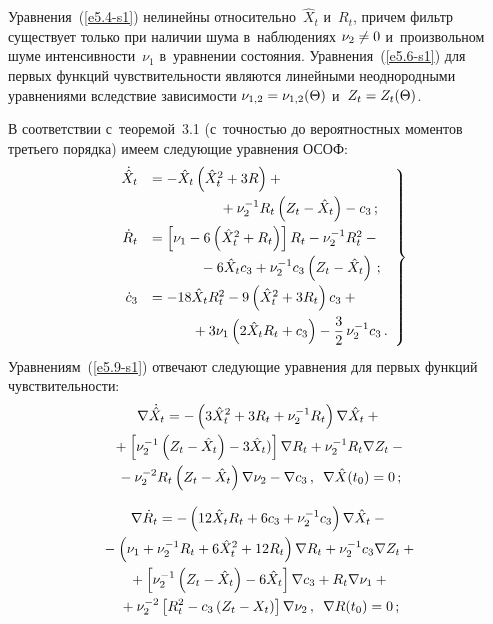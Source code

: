 \begin{multicols}{2}
Уравнения~(\ref{e5.4-s1}) нелинейны относительно~$\hat X_t$ и~$R_t$, 
причем фильтр существует только при наличии шума в~наблюдениях  $\nu_2 \hm\ne 0$ 
и~произвольном шуме интенсивности~$\nu_1$ в~уравнении состояния. 
Уравнения~(\ref{e5.6-s1}) 
для первых функций чувствительности являются линейными неоднородными уравнениями 
вследствие зависимости $\nu_{1,2} \hm= \nu_{1,2} (\Theta)$ и~$Z_t\hm = Z_t (\Theta)$.

 В соответствии с~теоремой~3.1 (с~точ\-ностью до вероятностных моментов третьего порядка) 
 имеем следующие уравнения ОСОФ:
 \begin{equation}
 \left.
 \begin{array}{rl}
 \dot{\hat X}_t &=-\hat X_t \left(\hat X_t^2 + 3 R\right) + {}\\[6pt]
 &\hspace*{17mm}{}+\nu_2^{-1} R_t 
 \left(Z_t - \hat X_t\right) - c_3\,; %
 \\[6pt]
\dot R_t &= \lk\nu_1 - 6 \left(\hat X_t^2 + R_t\right)\rk R_t - 
  \nu_2^{-1} R_t^2 - {}\\[6pt]
  &\hspace*{12mm}{}-
 6 \hat X_t c_3 + \nu_2^{-1} c_3 \left(Z_t - \hat X_t\right)\,; %
 \\[6pt]
  \dot c_3 &= -18 \hat X_t R_t^2 - 9 \left(\hat X_t^2 + 3 R_t\right) 
  c_3+ {}\\[6pt]
& \hspace*{10mm} {}+
 3 \nu_1 \left( 2 \hat X_t R_t + c_3\right) - \fr{3}{2}\, \nu_2^{-1} c_3\,.
 \end{array}
 \right\}
 \label{e5.9-s1}
 \end{equation}
Уравнениям~(\ref{e5.9-s1}) отвечают следующие уравнения 
для первых функций чувствительности:
\begin{multline*}
\nabla \dot{\hat X}_t=- \left(3 \hat X_t^2 + 3 R_t + \nu_2^{-1} R_t\right) 
\nabla \hat X_t +{}\\
{}+\lk \nu_2^{-1} \left(Z_t -\hat X_t\right) - 3 \hat X_t)\rk \nabla R_t +
 \nu_2^{-1} R_t\nabla Z_t - {}\\
 {}-\nu_2^{-2} R_t 
\left(Z_t -\hat X_t\right) \nabla \nu_2 - \nabla c_3\,,\enskip 
\nabla \hat X(t_0)=0\,; %
\end{multline*}

  
  \noindent
  \begin{multline*}
\nabla \dot R_t =-\left(12\hat X_t R_t + 6 c_3 + \nu_2^{-1} c_3\right) 
\nabla \hat X_t -{}\\
{}- \left(\nu_1+\nu_2^{-1} R_t + 6 \hat X_t^2 + 12 R_t\right) 
\nabla R_t+\nu_2^{-1} c_3 \nabla Z_t +{}\\
{}+  \left[ \nu_2^{-1} \left(Z_t -\hat X_t\right) - 6 \hat X_t\right] \nabla c_3 + 
R_t\nabla \nu_1+ {}\\
{}+\nu_2^{-2} \left[ R_t^2 - c_3 \left(Z_t-X_t\right)\right]
\nabla \nu_2\,,\enskip \nabla R(t_0)=0\,;
\end{multline*}


\end{multicols}
